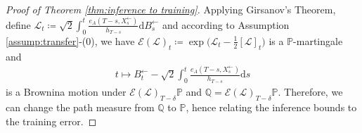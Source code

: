 \documentclass[11pt]{article}
\newcommand{\mb}{\mathbb}
\newcommand{\dee}{\mathrm{d}}
\newcommand{\mc}{\mathcal}
\begin{document}
\begin{proof}[Proof of Theorem \ref{thm:inference to training}]
    Applying Girsanov's Theorem, define $\mc{L}_t\coloneqq \sqrt{2}\int_0^t \tfrac{e_A(T-s,X_s^\leftarrow)}{h_{T-s}}\dee B_s^\leftarrow $ and according to Assumption \ref{assump:transfer}-(0), we have $\mc{E}(\mc{L})_t \coloneqq \exp \big( \mc{L}_t - \frac{1}{2} [\mc{L}]_t  \big)$ is a $\mb{P}$-martingale and
\begin{align*}
    t\mapsto  B_t^\leftarrow - \sqrt{2}\int_0^t \frac{e_A(T-s,X_s^\leftarrow)}{h_{T-s}}\dee s
\end{align*}
is a Brownina motion under $\mc{E}(\mc{L})_{T-\delta}\mb{P}$ and $\mb{Q}=\mc{E}(\mc{L})_{T-\delta}\mb{P}$. Therefore, we can change the path measure from $\mb{Q}$ to $\mb{P}$, hence relating the inference bounds to the training error.


\end{proof}
\end{document}
